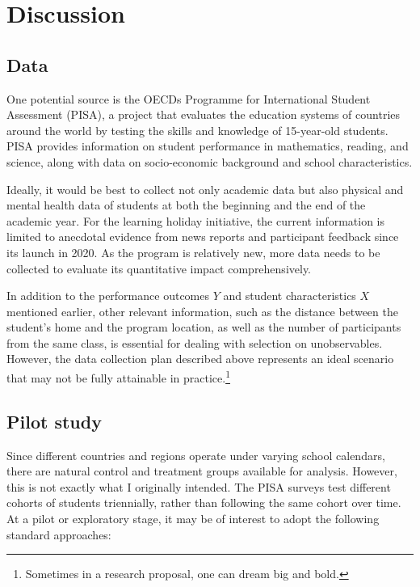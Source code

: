 \documentclass[12pt]{article}
\begin{document}
\section{Discussion}
\subsection{Data}
One potential source is the OECDs Programme for International Student
Assessment (PISA), a project that evaluates the education systems of countries
around the world by testing the skills and knowledge of 15-year-old students.
PISA provides information on student performance in mathematics, reading, and
science, along with data on socio-economic background and school
characteristics.

Ideally, it would be best to collect not only academic data but also physical
and mental health data of students at both the beginning and the end of the
academic year. For the learning holiday initiative, the current information is
limited to anecdotal evidence from news reports and participant feedback since
its launch in 2020. As the program is relatively new, more data needs to be
collected to evaluate its quantitative impact comprehensively.

In addition to the performance outcomes $Y$ and student characteristics $X$
mentioned earlier, other relevant information, such as the distance between the
student's home and the program location, as well as the number of participants
from the same class, is essential for dealing with selection on unobservables.
However, the data collection plan described above represents an ideal scenario
that may not be fully attainable in practice.\footnote{Sometimes in a research
    proposal, one can dream big and bold.}

\subsection{Pilot study}
Since different countries and regions operate under varying school calendars,
there are natural control and treatment groups available for analysis. However,
this is not exactly what I originally intended. The PISA surveys test different
cohorts of students triennially, rather than following the same cohort over
time. At a pilot or exploratory stage, it may be of interest to adopt the
following standard approaches:
\end{document}
